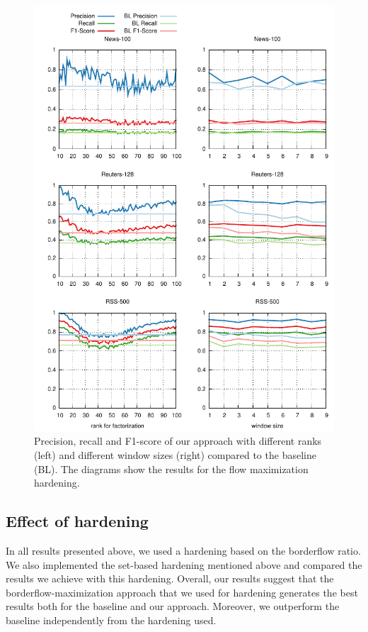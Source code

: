 \documentclass{llncs}
\begin{document}
\begin{figure}[t!]
\centering
\includegraphics[width = \textwidth]{results_Flow.pdf}
\caption{Precision, recall and F1-score of our approach with different ranks (left) and different window sizes (right) compared to the baseline (BL). The diagrams show the results for the flow maximization hardening.}
\label{fig:results}
\end{figure}
\afterpage{\clearpage}

\subsection{Effect of hardening}
In all results presented above, we used a hardening based on the borderflow ratio.
We also implemented the set-based hardening mentioned above and compared the results we achieve with this hardening.
Overall, our results suggest that the borderflow-maximization approach that we used for hardening generates the best results both for the baseline and our approach. 
Moreover, we outperform the baseline independently from the hardening used.
\end{document}
